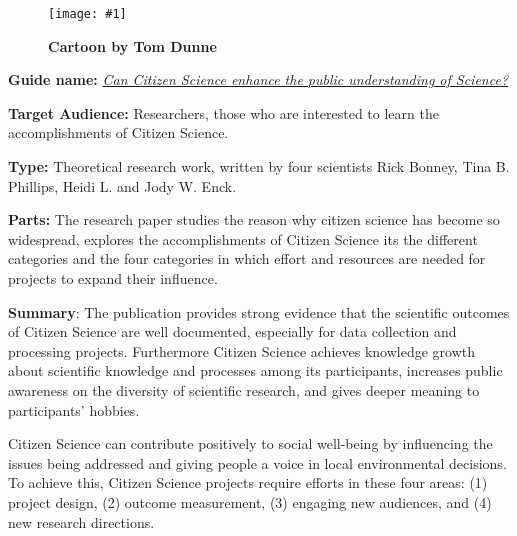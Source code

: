 \documentclass{article}
\newlength{\imgwidth}
\newcommand\scaledgraphics[2]{%
                
\settowidth{\imgwidth}{\texttt{[image: \#1]}}%
                
\setlength{\imgwidth}{\minof{\imgwidth}{#2\textwidth}}%
                
\texttt{[image: \#1]}%
                
}
\begin{document}
\begin{center}
\begin{figure}
\scaledgraphics{fb9872a4-8371-4bfe-a930-f1d621c5649e.png}{0.75}
\caption*{\textbf{Cartoon by Tom Dunne}}\label{F26530171}
\end{figure}


\end{center}





\textbf{Guide name: }\emph{\href{https://www.researchgate.net/profile/Tina-Phillips/publication/282669254_Can_citizen_science_enhance_public_understanding_of_science/links/5620083b08ae93a5c92439dd/Can-citizen-science-enhance-public-understanding-of-science.pdf}{Can Citizen Science enhance the public understanding of Science?}} \autocite{bonney_can_2015}


\textbf{Target Audience: }Researchers, those who are interested to learn the accomplishments of Citizen Science.


\textbf{Type: }Theoretical research work, written by four scientists Rick Bonney, Tina B. Phillips, Heidi L. and Jody W. Enck.


\textbf{Parts: }The research paper studies the reason why citizen science has become so widespread, explores the accomplishments of Citizen Science its the different categories and the four categories in which effort and resources are needed for projects to expand their influence.


\textbf{Summary}: The publication provides strong evidence that the scientific outcomes of Citizen Science are well documented, especially for data collection and processing projects. Furthermore Citizen Science achieves knowledge growth about scientific knowledge and processes among its participants, increases public awareness on the diversity of scientific research, and gives deeper meaning to participants' hobbies.


Citizen Science can contribute positively to social well-being by influencing the issues being addressed and giving people a voice in local environmental decisions. To achieve this, Citizen Science projects require efforts in these four areas: (1) project design, (2) outcome measurement, (3) engaging new audiences, and (4) new research directions.


\printbibliography[title={Bibliography}]
\end{document}
